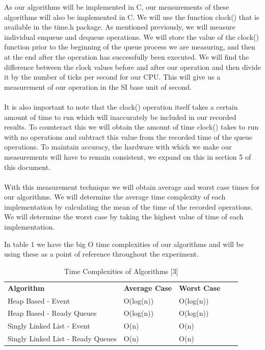 \documentclass[12pt]{article}
\begin{document}
As our algorithms will be implemented in C, our measurements of these algorithms will also be implemented in C. We will use the function clock() that is available in the time.h package. As mentioned previously, we will measure individual enqueue and dequeue operations. We will store the value of the clock() function prior to the beginning of the queue process we are measuring, and then at the end after the operation has successfully been executed. We will find the difference between the clock values before and after our operation and then divide it by the number of ticks per second for our CPU.  This will give us a measurement of our operation in the SI base unit of second.
\\
\\
It is also important to note that the clock() operation itself takes a certain amount of time to run which will inaccurately be included in our recorded results. To counteract this we will obtain the amount of time clock()  takes to run with no operations and subtract this value from the recorded time of the queue operations. To maintain accuracy, the hardware with which we make our measurements will have to remain consistent, we expand on this in section 5 of this document. 
\\
\\
With this measurement technique we will obtain average and worst case times for our algorithms. We will determine the average time complexity of each implementation by calculating the mean of the time of the recorded operations. We will determine the worst case by taking the highest value of time of each implementation.

In table 1 we have the big O time complexities of our algorithms and will be using these as a point of reference throughout the experiment.    

\begin{table}[h]
\caption{ Time Complexities of Algorithms [3]}
\begin{tabular}{|l|l|l|ll}
\cline{1-3}
\textbf{Algorithm}                & \textbf{Average Case} & \textbf{Worst Case} &  &  \\ \cline{1-3}Heap Based - Event                & O(log(n))    & O(log(n))  &  &  \\ \cline{1-3}
Heap Based - Ready Queues         & O(log(n))    & O(log(n))  &  &  \\ \cline{1-3}
Singly Linked List - Event        & O(n)         & O(n)       &  &  \\ \cline{1-3}
Singly Linked List - Ready Queues & O(n)         & O(n)       &  &  \\ \cline{1-3}
\end{tabular}
\end{table}
\end{document}

